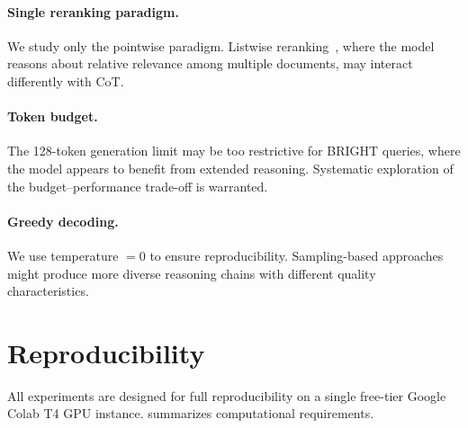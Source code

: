 \documentclass[12pt]{article}
\newcommand{\CoT}{CoT}
\begin{document}
\paragraph{Single reranking paradigm.}
We study only the pointwise paradigm.  Listwise reranking~\citep{pradeep2023rankzephyr},
where the model reasons about relative relevance among multiple documents, may
interact differently with \CoT{}.

\paragraph{Token budget.}
The 128-token generation limit may be too restrictive for BRIGHT queries, where
the model appears to benefit from extended reasoning.  Systematic exploration of
the budget--performance trade-off is warranted.

\paragraph{Greedy decoding.}
We use temperature $=0$ to ensure reproducibility.  Sampling-based approaches
might produce more diverse reasoning chains with different quality characteristics.

\section{Reproducibility}
\label{sec:repro}

All experiments are designed for full reproducibility on a single free-tier
Google Colab T4 GPU instance.   summarizes computational
requirements.
\end{document}
